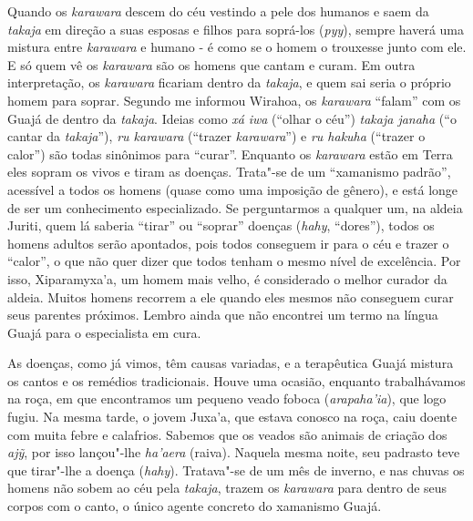 Quando os \emph{karawara} descem do céu vestindo a pele dos humanos e
saem da \emph{takaja} em direção a suas esposas e filhos para soprá-los
(\emph{pyy}), sempre haverá uma mistura entre \emph{karawara} e humano -
é como se o homem o trouxesse junto com ele. E só quem vê os
\emph{karawara} são os homens que cantam e curam. Em outra
interpretação, os \emph{karawara} ficariam dentro da \emph{takaja}, e
quem sai seria o próprio homem para soprar. Segundo me informou Wirahoa,
os \emph{karawara} ``falam'' com os Guajá de dentro da \emph{takaja}.
Ideias como \emph{xá} \emph{iwa} (``olhar o céu'') \emph{takaja janaha}
(``o cantar da \emph{takaja}''), \emph{ru karawara} (``trazer
\emph{karawara}'') e \emph{ru hakuha} (``trazer o calor'') são todas
sinônimos para ``curar''. Enquanto os \emph{karawara} estão em Terra eles
sopram os vivos e tiram as doenças. Trata"-se de um ``xamanismo padrão'',
acessível a todos os homens (quase como uma imposição de gênero), e está
longe de ser um conhecimento especializado. Se perguntarmos a qualquer
um, na aldeia Juriti, quem lá saberia ``tirar'' ou ``soprar'' doenças
(\emph{hahy}, ``dores''), todos os homens adultos serão apontados, pois
todos conseguem ir para o céu e trazer o ``calor'', o que não quer dizer
que todos tenham o mesmo nível de excelência. Por isso, Xiparamyxa'a, um
homem mais velho, é considerado o melhor curador da aldeia. Muitos
homens recorrem a ele quando eles mesmos não conseguem curar seus
parentes próximos. Lembro ainda que não encontrei um termo na língua
Guajá para o especialista em cura.

As doenças, como já vimos, têm causas variadas, e a terapêutica Guajá
mistura os cantos e os remédios tradicionais. Houve uma ocasião,
enquanto trabalhávamos na roça, em que encontramos um pequeno veado
foboca (\emph{arapaha'ia}), que logo fugiu. Na mesma tarde, o jovem
Juxa'a, que estava conosco na roça, caiu doente com muita febre e
calafrios. Sabemos que os veados são animais de criação dos \emph{ajỹ},
por isso lançou"-lhe \emph{ha'aera} (raiva). Naquela mesma noite, seu
padrasto teve que tirar"-lhe a doença (\emph{hahy}). Tratava"-se de um mês
de inverno, e nas chuvas os homens não sobem ao céu pela \emph{takaja},
trazem os \emph{karawara} para dentro de seus corpos com o canto, o
único agente concreto do xamanismo Guajá.

